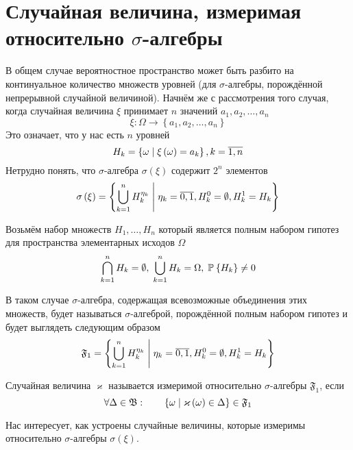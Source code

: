 \section{Случайная величина, измеримая относительно $\sigma$-алгебры}
В общем случае вероятностное пространство может быть разбито
на континуальное количество множеств уровней
(для $\sigma$-алгебры, порождённой непрерывной случайной величиной).
Начнём же с рассмотрения того случая,
когда случайная величина $\xi$ принимает $n$ значений
$a_1, a_2, \dots, a_n$
$$\xi: \Omega \rightarrow \left\{ a_1, a_2, \dots, a_n \right\}$$
Это означает, что у нас есть $n$ уровней
$$H_k = \left\{ \omega \;\middle|\; \xi\left( \omega \right) = a_k \right\},
  k= \overline{1,n}$$
Нетрудно понять,
что $\sigma$-алгебра $\sigma\left( \xi \right)$ содержит $2^n$ элементов
$$\sigma\left( \xi \right) = \left\{ \bigcup_{k=1}^n H_k^{\eta_k}
  \;\middle|\; \eta_k = \overline{0,1}, H_k^0 = \emptyset, H_k^1 = H_k \right\}$$

\begin{definition}
  Возьмём набор множеств $H_1, \dots, H_n$ который является полным набором
  гипотез для пространства элементарных исходов $\Omega$
  $$\bigcap_{k=1}^n H_k = \emptyset,\; \bigcup_{k=1}^n H_k = \Omega,\;
      \mathbb{P}_{{}}\left\{ H_k \right\} \neq 0$$

  В таком случае $\sigma$-алгебра, содержащая всевозможные объединения этих
  множеств, будет называться $\sigma$-алгеброй, порождённой полным набором
  гипотез и будет выглядеть следующим образом
  $$\mathfrak{F}_1 = \left\{ \bigcup_{k=1}^n H_k^{\eta_k}
      \;\middle|\; \eta_k = \overline{0,1},
      H_k^0 = \emptyset, H_k^1 = H_k \right\}$$
\end{definition}

\begin{definition}
  Случайная величина $\varkappa$ называется измеримой относительно
  $\sigma$-алгебры $\mathfrak{F}_1$, если
  \begin{equation*}
    \forall \Delta \in \mathfrak{B}:\qquad
      \left\{ \omega \;\middle|\; \varkappa\left( \omega \right) \in \Delta \right\}
      \in \mathfrak{F}_1
  \end{equation*}
\end{definition}

Нас интересует, как устроены случайные величины,
которые измеримы относительно $\sigma$-алгебры $\sigma\left( \xi \right)$.

